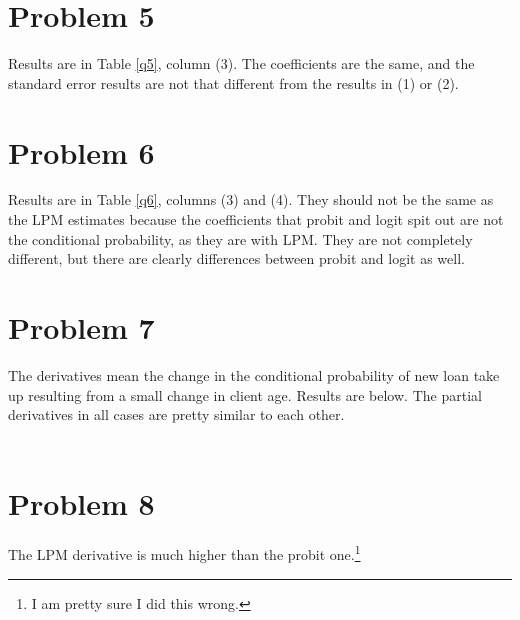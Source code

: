 \documentclass[11pt]{article}
\newcommand{\tabref}[1]{Table \ref{#1}}
\begin{document}
\newpage
\section*{Problem 5}
Results are in \tabref{q5}, column (3). The coefficients are the same, and the standard error results are not that different from the results in (1) or (2). 




\newpage
\section*{Problem 6}
Results are in \tabref{q6}, columns (3) and (4). They should not be the same as the LPM estimates because the coefficients that probit and logit spit out are not the conditional probability, as they are with LPM. They are not completely different, but there are clearly differences between probit and logit as well. 


\newpage
\section*{Problem 7}
The derivatives mean the change in the conditional probability of new loan take up resulting from a small change in client age. Results are below. The partial derivatives in all cases are pretty similar to each other. 
\\\\
\begin{center}

\end{center}


\newpage
\section*{Problem 8}
The LPM derivative is much higher than the probit one.\footnote{I am pretty sure I did this wrong.}

\end{document}
